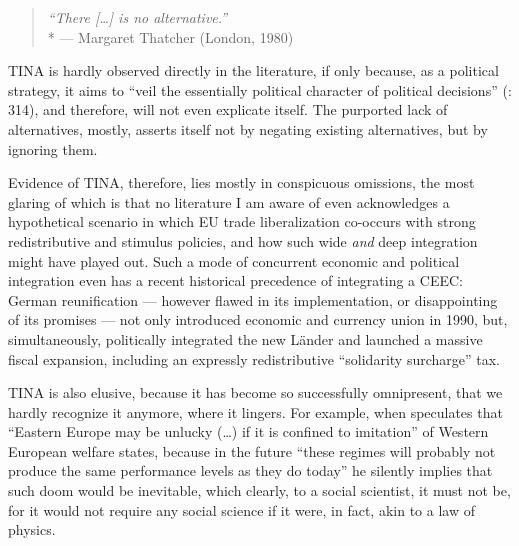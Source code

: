 \begin{quote}
	\emph{``There [\ldots] is no alternative.''}\\*
	--- Margaret Thatcher (London, 1980)
\end{quote}

TINA is hardly observed directly in the literature, if only because, as a political strategy, it aims to ``veil the essentially political character of political decisions'' (\citealt{Bluhdorn-2007-aa}: 314), and therefore, will not even explicate itself. The purported lack of alternatives, mostly, asserts itself not by negating existing alternatives, but by ignoring them.

Evidence of TINA, therefore, lies mostly in conspicuous omissions, the most glaring of which is that no literature I am aware of even acknowledges a hypothetical scenario in which \gls{EU} trade liberalization co-occurs with strong redistributive and stimulus policies, and how such wide \emph{and} deep integration might have played out.   Such a mode of concurrent economic and political integration even has a recent historical precedence of integrating a \gls{CEEC}: German reunification --- however flawed in its implementation, or disappointing of its promises --- not only introduced economic and currency union in 1990, but, simultaneously, politically integrated the new L\"ander and launched a massive fiscal expansion, including an expressly redistributive ``solidarity surcharge'' tax.

TINA is also elusive, because it has become so successfully omnipresent, that we hardly recognize it anymore, where it lingers. For example, when \citeauthor{Kovasc} speculates that ``Eastern Europe may be unlucky (\ldots) if it is confined to imitation'' of Western European welfare states, because in the future ``these regimes will probably not produce the same performance levels as they do today'' he silently implies that such doom would be inevitable, which clearly, to a social scientist, it must not be, for it would not require any social science if it were, in fact, akin to a law of physics.

